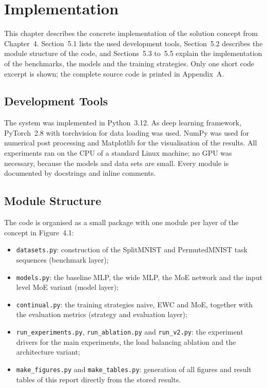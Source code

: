 \chapter{Implementation}
\label{chap:implementation}

This chapter describes the concrete implementation of the solution concept
from Chapter~4. Section~5.1 lists the used development tools,
Section~5.2 describes the module structure of the code, and
Sections~5.3 to~5.5 explain the implementation of the benchmarks, the
models and the training strategies. Only one short code excerpt is shown;
the complete source code is printed in Appendix~A.

\section{Development Tools}
\label{sec:stack}

The system was implemented in Python~3.12. As deep learning framework,
PyTorch~2.8 \cite{paszke2019} with torchvision for data loading was used.
NumPy was used for numerical post processing and Matplotlib for the
visualisation of the results. All experiments ran on the CPU of a standard
Linux machine; no GPU was necessary, because the models and data sets are
small. Every module is documented by docstrings and inline comments.

\section{Module Structure}
\label{sec:implstructure}

The code is organised as a small package with one module per layer of the
concept in Figure~4.1:

\begin{itemize}[leftmargin=2em]
  \item \texttt{datasets.py}: construction of the SplitMNIST and
        PermutedMNIST task sequences (benchmark layer);
  \item \texttt{models.py}: the baseline MLP, the wide MLP, the MoE network
        and the input level MoE variant (model layer);
  \item \texttt{continual.py}: the training strategies naive, EWC and MoE,
        together with the evaluation metrics (strategy and evaluation
        layer);
  \item \texttt{run\_experiments.py}, \texttt{run\_ablation.py} and
        \texttt{run\_v2.py}: the experiment drivers for the main
        experiments, the load balancing ablation and the architecture
        variant;
  \item \texttt{make\_figures.py} and \texttt{make\_tables.py}: generation
        of all figures and result tables of this report directly from the
        stored results.
\end{itemize}

